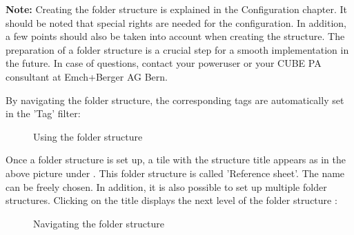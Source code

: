 \vspace{\baselineskip}

\textbf{Note:} Creating the folder structure is explained in the Configuration chapter. It should be noted that special rights are needed for the configuration. In addition, a few points should also be taken into account when creating the structure. The preparation of a folder structure is a crucial step for a smooth implementation in the future. In case of questions, contact your poweruser or your CUBE PA consultant at Emch+Berger AG Bern.

\vspace{\baselineskip}

By navigating the folder structure, the corresponding tags are automatically set in the 'Tag' filter:

\begin{figure}[H]
\caption{Using the folder structure}
\end{figure}

Once a folder structure is set up, a tile with the structure title appears as in the above picture under . This folder structure is called 'Reference sheet'. The name can be freely chosen. In addition, it is also possible to set up multiple folder structures. Clicking on the title displays the next level of the folder structure :

\begin{figure}[H]
\caption{Navigating the folder structure}
\end{figure}

